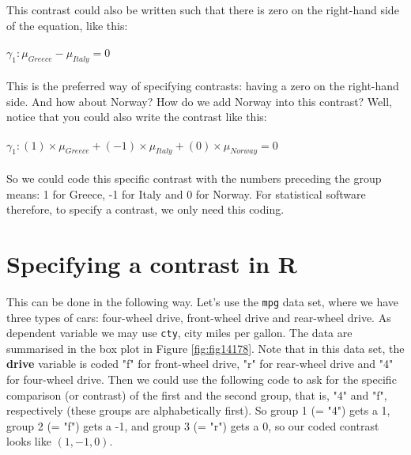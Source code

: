 This contrast could also be written such that there is zero on the right-hand side of the equation, like this:
\\
\\
$\gamma_1: \mu_{Greece}-\mu_{Italy}=0$
\\
\\
This is the preferred way of specifying contrasts: having a zero on the right-hand side. And how about Norway? How do we add Norway into this contrast? Well, notice that you could also write the contrast like this:
\\
\\
$\gamma_1: (1)\times \mu_{Greece} + (-1) \times \mu_{Italy} + (0) \times \mu_{Norway} =0$
\\
\\
So we could code this specific contrast with the numbers preceding the group means: 1 for Greece, -1 for Italy and 0 for Norway. For statistical software therefore, to specify a contrast, we only need this coding. 


\section{Specifying a contrast in R}


This can be done in the following way. Let's use the \texttt{mpg} data set, where we have three types of cars: four-wheel drive, front-wheel drive and rear-wheel drive. As dependent variable we may use \texttt{cty}, city miles per gallon. The data are summarised in the box plot in Figure \ref{fig:fig14178}. Note that in this data set, the \textbf{drive} variable is coded "f" for front-wheel drive, "r" for rear-wheel drive and "4" for four-wheel drive. Then we could use the following code to ask for the specific comparison (or contrast) of the first and the second group, that is, "4" and "f", respectively (these groups are alphabetically first). So group 1 (= "4") gets a 1, group 2 (= "f") gets a -1, and group 3 (= "r") gets a 0, so our coded contrast looks like $(1, -1, 0)$.



\begin{knitrout}
\color{fgcolor}\begin{kframe}


{\ttfamily\noindent\bfseries{}}\end{kframe}
\end{knitrout}


